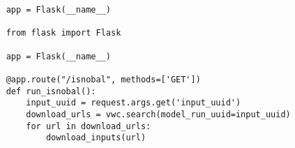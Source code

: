 \documentclass[11pt,a4paper]{scrartcl}
\begin{document}
\begin{verbatim}
    app = Flask(__name__)

    from flask import Flask

    app = Flask(__name__)

    @app.route("/isnobal", methods=['GET'])
    def run_isnobal():
        input_uuid = request.args.get('input_uuid')
        download_urls = vwc.search(model_run_uuid=input_uuid)
        for url in download_urls:
            download_inputs(url)
\end{verbatim}
\end{document}
